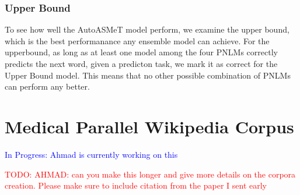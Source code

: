 \documentclass[11pt]{article}
\newcommand{\todo}[1]{\textcolor{red}{TODO: #1}}
\newcommand{\comment}[1]{\textcolor{blue}{In Progress: #1}}
\begin{document}
\subsubsection{Upper Bound}

To see how well the AutoASMeT model perform, we examine the upper bound, which is the best performanance any ensemble model can achieve. For the upperbound, as long as at least one model among the four PNLMs correctly predicts the next word, given a predicton task, we mark it as correct for the Upper Bound model. This means that no other possible combination of PNLMs can perform any better.

\section{Medical Parallel Wikipedia Corpus} \label{sec:medical_corpora}\comment{Ahmad is currently working on this}

\todo{AHMAD: can you make this longer and give more details on the corpora creation. Please make sure to include citation from the paper I sent early}
\end{document}
